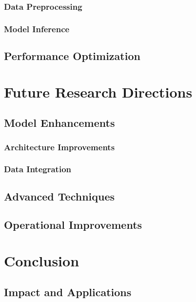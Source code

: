 \documentclass[12pt,a4paper]{article}
\begin{document}
\subsubsection{Data Preprocessing}

\subsubsection{Model Inference}

\subsection{Performance Optimization}

\section{Future Research Directions}

\subsection{Model Enhancements}


\subsubsection{Architecture Improvements}

\subsubsection{Data Integration}

\subsection{Advanced Techniques}

\subsection{Operational Improvements}

\section{Conclusion}

\subsection{Impact and Applications}
\end{document}
